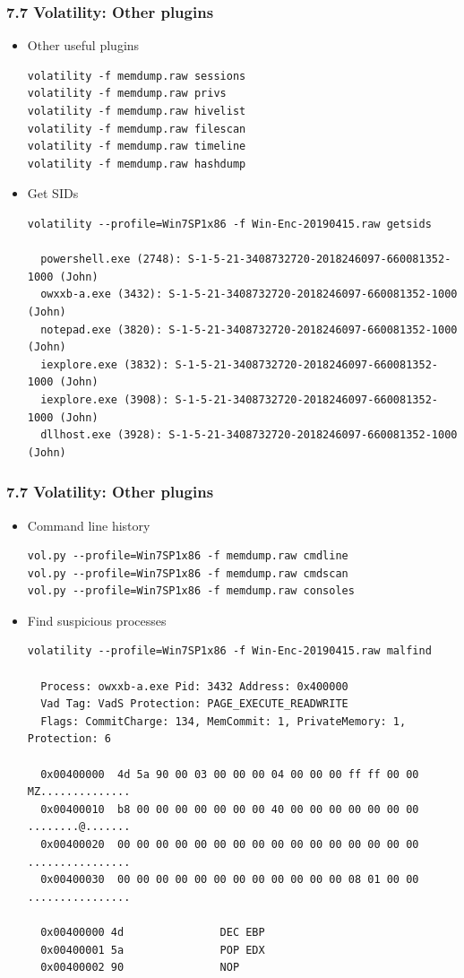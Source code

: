 \begin{frame}[fragile]
  \frametitle{7.7 Volatility: Other plugins}
    \begin{itemize}
        \item Other useful plugins
    \begin{lstlisting}[basicstyle=\tiny]
volatility -f memdump.raw sessions
volatility -f memdump.raw privs
volatility -f memdump.raw hivelist
volatility -f memdump.raw filescan
volatility -f memdump.raw timeline
volatility -f memdump.raw hashdump
    \end{lstlisting}
        \item Get SIDs
    \begin{lstlisting}[basicstyle=\tiny]
volatility --profile=Win7SP1x86 -f Win-Enc-20190415.raw getsids

  powershell.exe (2748): S-1-5-21-3408732720-2018246097-660081352-1000 (John)
  owxxb-a.exe (3432): S-1-5-21-3408732720-2018246097-660081352-1000 (John)
  notepad.exe (3820): S-1-5-21-3408732720-2018246097-660081352-1000 (John)
  iexplore.exe (3832): S-1-5-21-3408732720-2018246097-660081352-1000 (John)
  iexplore.exe (3908): S-1-5-21-3408732720-2018246097-660081352-1000 (John)
  dllhost.exe (3928): S-1-5-21-3408732720-2018246097-660081352-1000 (John)
    \end{lstlisting}
    \end{itemize}
\end{frame}


\begin{frame}[fragile]
  \frametitle{7.7 Volatility: Other plugins}
    \begin{itemize}
        \item Command line history
    \begin{lstlisting}[basicstyle=\tiny]
vol.py --profile=Win7SP1x86 -f memdump.raw cmdline
vol.py --profile=Win7SP1x86 -f memdump.raw cmdscan
vol.py --profile=Win7SP1x86 -f memdump.raw consoles
    \end{lstlisting}
        \item Find suspicious processes
    \begin{lstlisting}[basicstyle=\tiny]
volatility --profile=Win7SP1x86 -f Win-Enc-20190415.raw malfind

  Process: owxxb-a.exe Pid: 3432 Address: 0x400000
  Vad Tag: VadS Protection: PAGE_EXECUTE_READWRITE
  Flags: CommitCharge: 134, MemCommit: 1, PrivateMemory: 1, Protection: 6

  0x00400000  4d 5a 90 00 03 00 00 00 04 00 00 00 ff ff 00 00   MZ..............
  0x00400010  b8 00 00 00 00 00 00 00 40 00 00 00 00 00 00 00   ........@.......
  0x00400020  00 00 00 00 00 00 00 00 00 00 00 00 00 00 00 00   ................
  0x00400030  00 00 00 00 00 00 00 00 00 00 00 00 08 01 00 00   ................

  0x00400000 4d               DEC EBP
  0x00400001 5a               POP EDX
  0x00400002 90               NOP
    \end{lstlisting}
    \end{itemize}
\end{frame}


